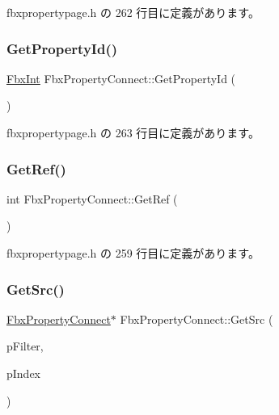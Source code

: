  fbxpropertypage.\+h の 262 行目に定義があります。

\mbox{\label{class_fbx_property_connect_af2dd9a64ff4fa806d330d7f21eeb9dbf}} 
\subsubsection{\texorpdfstring{Get\+Property\+Id()}{GetPropertyId()}}
{\footnotesize\ttfamily \hyperlink{fbxtypes_8h_a088fa96de3b0b3ea69f0f6afef525dfb}{Fbx\+Int} Fbx\+Property\+Connect\+::\+Get\+Property\+Id (\begin{DoxyParamCaption}{ }\end{DoxyParamCaption})\hspace{0.3cm}{\ttfamily [inline]}}



 fbxpropertypage.\+h の 263 行目に定義があります。

\mbox{\label{class_fbx_property_connect_a085658a0559ff68f4eb555f0d981e038}} 
\subsubsection{\texorpdfstring{Get\+Ref()}{GetRef()}}
{\footnotesize\ttfamily int Fbx\+Property\+Connect\+::\+Get\+Ref (\begin{DoxyParamCaption}{ }\end{DoxyParamCaption})\hspace{0.3cm}{\ttfamily [inline]}}



 fbxpropertypage.\+h の 259 行目に定義があります。

\mbox{\label{class_fbx_property_connect_a7e32cdbf1b598eb7d187af169b9939e1}} 
\subsubsection{\texorpdfstring{Get\+Src()}{GetSrc()}}
{\footnotesize\ttfamily \hyperlink{class_fbx_property_connect}{Fbx\+Property\+Connect}$\ast$ Fbx\+Property\+Connect\+::\+Get\+Src (\begin{DoxyParamCaption}\item[{\hyperlink{class_fbx_connection_point_filter}{Fbx\+Connection\+Point\+Filter} $\ast$}]{p\+Filter,  }\item[{int}]{p\+Index }\end{DoxyParamCaption})\hspace{0.3cm}{\ttfamily [inline]}}



